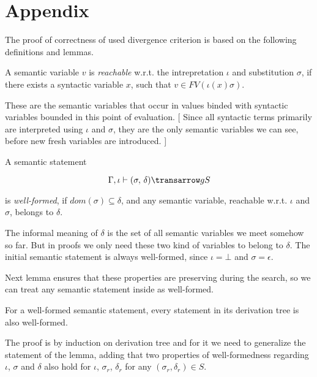 \section{Appendix}
\label{appendix}

The proof of correctness of used divergence criterion is based on the following definitions and lemmas.

\begin{definition}
\normalfont
A semantic variable $v$ is \emph{reachable} w.r.t. the intrepretation $\iota$ and substitution $\sigma$, if there exists 
a syntactic variable $x$, such that \mbox{$v \in FV(\iota(x) \sigma)$}.
\end{definition}

These are the semantic variables that occur in values binded with syntactic variables bounded in this point of evaluation. [ Since all syntactic terms primarily are interpreted using $\iota$ and $\sigma$, they are the only semantic variables we can see, before new fresh variables are introduced. ]

\begin{definition}
\normalfont
A semantic statement 

$$
\otrans{\Gamma,\iota}{(\sigma,\,\delta)}{g}{S}
$$ 

\noindent is \emph{well-formed}, if \mbox{$dom(\sigma) \subseteq \delta$}, and any semantic variable, reachable w.r.t. $\iota$ and $\sigma$, belongs to $\delta$.  
\end{definition}

The informal meaning of $\delta$ is the set of all semantic variables we meet somehow so far. But in proofs we only need these two kind of variables to belong to $\delta$. The initial semantic statement is always well-formed, since $\iota = \bot$ and $\sigma = \epsilon$.

Next lemma ensures that these properties are preserving during the search, so we can treat any semantic statement inside as well-formed.

\begin{lemma}
\label{one}
\normalfont
 For a well-formed semantic statement, every statement in its derivation tree is also well-formed.
\end{lemma}

The proof is by induction on derivation tree and for it we need to generalize the statement of the lemma, adding that two properties of well-formedness regarding $\iota$, $\sigma$ and $\delta$ also hold for $\iota$, $\sigma_r$, $\delta_r$ for any $(\sigma_r, \delta_r) \in S$.


